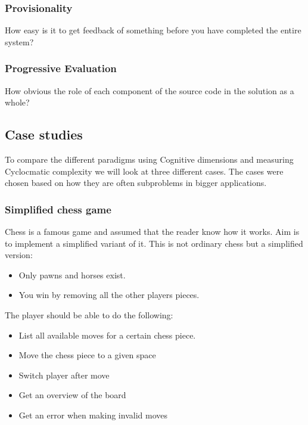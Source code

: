 \documentclass[12pt]{article}
\theoremstyle{definition}
\theoremstyle{theorem}
\begin{document}
\subsubsection{Provisionality}

How easy is it to get feedback of something before you have completed the entire
system?

\subsubsection{Progressive Evaluation}

How obvious the role of each component of the source code in the solution as a
whole?~\cite{GREEN1996131}

\subsection{Case studies}

To compare the different paradigms using Cognitive dimensions and measuring
Cyclocmatic complexity we will look at three different cases. The cases were
chosen based on how they are often subproblems in bigger applications.

\subsubsection{Simplified chess game}

Chess is a famous game and assumed that the reader know how it works. Aim
is to implement a simplified variant of it. This is not ordinary chess but a
simplified version:

\begin{itemize} 
    \item Only pawns and horses exist.
    \item You win by removing all the other players pieces.
\end{itemize}

The player should be able to do the following:

\begin{itemize} 
    \item List all available moves for a certain chess piece. 
    \item Move the chess piece to a given space
    \item Switch player after move
    \item Get an overview of the board
    \item Get an error when making invalid moves
\end{itemize}
\end{document}
